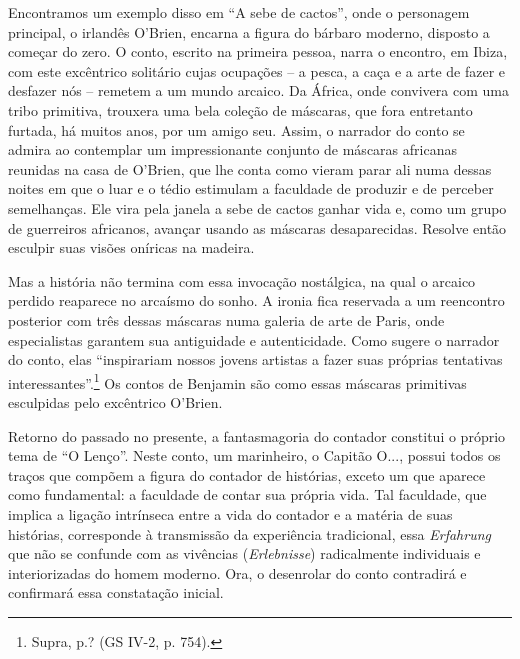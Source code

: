 Encontramos um exemplo disso em ``A sebe de cactos'', onde o personagem
principal, o irlandês O'Brien, encarna a figura do bárbaro moderno,
disposto a começar do zero. O conto, escrito na primeira pessoa, narra o
encontro, em Ibiza, com este excêntrico solitário cujas ocupações -- a
pesca, a caça e a arte de fazer e desfazer nós -- remetem a um mundo
arcaico. Da África, onde convivera com uma tribo primitiva, trouxera uma
bela coleção de máscaras, que fora entretanto furtada, há muitos anos,
por um amigo seu. Assim, o narrador do conto se admira ao contemplar um
impressionante conjunto de máscaras africanas reunidas na casa de
O'Brien, que lhe conta como vieram parar ali numa dessas noites em que o
luar e o tédio estimulam a faculdade de produzir e de perceber
semelhanças. Ele vira pela janela a sebe de cactos ganhar vida e, como
um grupo de guerreiros africanos, avançar usando as máscaras
desaparecidas. Resolve então esculpir suas visões oníricas na madeira.

Mas a história não termina com essa invocação nostálgica, na qual o
arcaico perdido reaparece no arcaísmo do sonho. A ironia fica reservada
a um reencontro posterior com três dessas máscaras numa galeria de arte
de Paris, onde especialistas garantem sua antiguidade e autenticidade.
Como sugere o narrador do conto, elas ``inspirariam nossos jovens
artistas a fazer suas próprias tentativas interessantes''.\footnote{Supra,
  p.? (GS IV-2, p. 754).} Os contos de Benjamin são como essas máscaras
primitivas esculpidas pelo excêntrico O'Brien.

Retorno do passado no presente, a fantasmagoria do contador constitui o
próprio tema de ``O Lenço''. Neste conto, um marinheiro, o Capitão O...,
possui todos os traços que compõem a figura do contador de histórias,
exceto um que aparece como fundamental: a faculdade de contar sua
própria vida. Tal faculdade, que implica a ligação intrínseca entre a
vida do contador e a matéria de suas histórias, corresponde à
transmissão da experiência tradicional, essa \emph{Erfahrung} que não se
confunde com as vivências (\emph{Erlebnisse}) radicalmente individuais e
interiorizadas do homem moderno. Ora, o desenrolar do conto contradirá e
confirmará essa constatação inicial.

